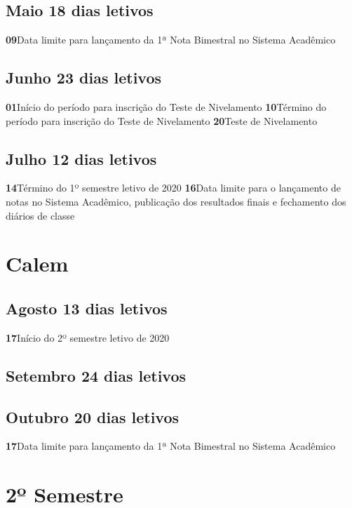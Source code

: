 \documentclass[thesis]{hmcposter}
\begin{document}
\begin{poster}
									\subsection{Maio \hfill 18 dias letivos}\textbf{09}\qquad Data limite para lançamento da 1ª Nota Bimestral no Sistema Acadêmico
 \subsection{Junho \hfill 23 dias letivos}\textbf{01}\qquad Início do período para inscrição do Teste de Nivelamento
 \newline\textbf{10}\qquad Término do período para inscrição do Teste de Nivelamento \newline\textbf{20}\qquad Teste de Nivelamento
 \subsection{Julho \hfill 12 dias letivos}\textbf{14}\qquad Término do 1º semestre letivo de 2020
 \newline\textbf{16}\qquad Data limite para o lançamento de notas no Sistema Acadêmico, publicação dos resultados finais e fechamento dos diários de classe
 \newpage
\section{\color{hmcorange}Calem}\subsection{Agosto \hfill 13 dias letivos}\textbf{17}\qquad Início do 2º semestre letivo de 2020 \subsection{Setembro \hfill 24 dias letivos} \null \newline \subsection{Outubro \hfill 20 dias letivos}\textbf{17}\qquad Data limite para lançamento da 1ª Nota Bimestral no Sistema Acadêmico \vfill\null
\columnbreak
\section{\hfill \color{hmcorange}2º Semestre}

\end{poster}
\end{document}
